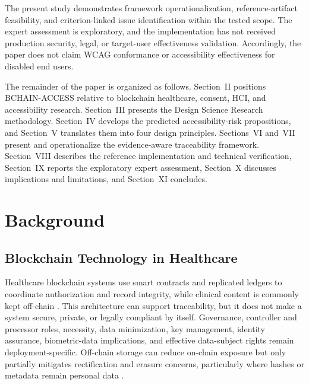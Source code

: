 \documentclass[journal]{IEEEtran}
\begin{document}
The present study demonstrates framework operationalization, reference-artifact feasibility, and criterion-linked issue identification within the tested scope. The expert assessment is exploratory, and the implementation has not received production security, legal, or target-user effectiveness validation. Accordingly, the paper does not claim WCAG conformance or accessibility effectiveness for disabled end users.

The remainder of the paper is organized as follows. Section~II positions BCHAIN-ACCESS relative to blockchain healthcare, consent, HCI, and accessibility research. Section~III presents the Design Science Research methodology. Section~IV develops the predicted accessibility-risk propositions, and Section~V translates them into four design principles. Sections~VI and~VII present and operationalize the evidence-aware traceability framework. Section~VIII describes the reference implementation and technical verification, Section~IX reports the exploratory expert assessment, Section~X discusses implications and limitations, and Section~XI concludes.
\section{Background}
\label{sec:background}

\subsection{Blockchain Technology in Healthcare}
Healthcare blockchain systems use smart contracts and replicated ledgers to coordinate authorization and record integrity, while clinical content is commonly kept off-chain \cite{kim2022blockchain,zhang2018fhirchain,dagher2018ancile}. This architecture can support traceability, but it does not make a system secure, private, or legally compliant by itself. Governance, controller and processor roles, necessity, data minimization, key management, identity assurance, biometric-data implications, and effective data-subject rights remain deployment-specific. Off-chain storage can reduce on-chain exposure but only partially mitigates rectification and erasure concerns, particularly where hashes or metadata remain personal data \cite{edpb2025blockchain}.
\end{document}
